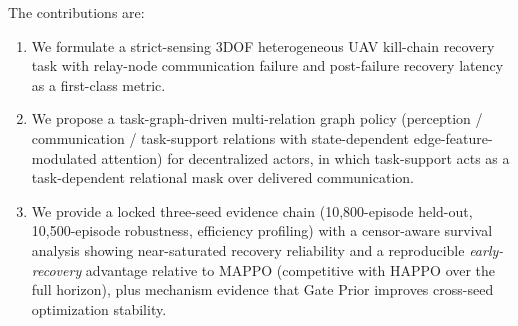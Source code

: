 The contributions are:
\begin{enumerate}
    \item We formulate a strict-sensing 3DOF heterogeneous UAV kill-chain recovery task with relay-node communication failure and post-failure recovery latency as a first-class metric.
    \item We propose a task-graph-driven multi-relation graph policy (perception / communication / task-support relations with state-dependent edge-feature-modulated attention) for decentralized actors, in which task-support acts as a task-dependent relational mask over delivered communication.
    \item We provide a locked three-seed evidence chain (10{,}800-episode held-out, 10{,}500-episode robustness, efficiency profiling) with a censor-aware survival analysis showing near-saturated recovery reliability and a reproducible \emph{early-recovery} advantage relative to MAPPO (competitive with HAPPO over the full horizon), plus mechanism evidence that Gate Prior improves cross-seed optimization stability.
\end{enumerate}
